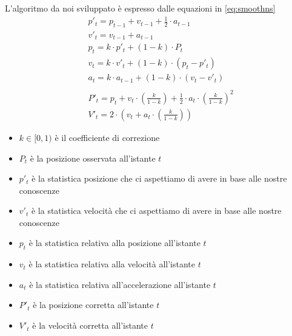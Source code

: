 L'algoritmo da noi sviluppato è espresso dalle equazioni in \ref{eq:smoothns}
\begin{equation}
    \label{eq:smoothns}
    \begin{split}
        & p'_t = p_{t-1} + v_{t-1} + \frac{1}{2} \cdot a_{t-1} \\
        & v'_t = v_{t-1} + a_{t-1} \\
        & p_t = k \cdot p'_t + (1-k) \cdot P_t \\
        & v_t = k \cdot v'_t + (1-k) \cdot (p_t - p'_t) \\
        & a_t = k \cdot a_{t-1} + (1-k) \cdot (v_t - v'_t) \\
        & \\
        & P'_t = p_t + v_t \cdot \left(\frac{k}{1-k}\right) + \frac{1}{2} \cdot a_t \cdot \left(\frac{k}{1-k}\right)^2 \\
        & V'_t = 2 \cdot \left(v_t + a_t \cdot \left(\frac{k}{1-k}\right)\right)
    \end{split}
\end{equation}
\begin{itemize}
    \item $k \in [0, 1)$ è il coefficiente di correzione
    \item $P_t$ è la posizione osservata all'istante $t$
    \item $p'_t$ è la statistica posizione che ci aspettiamo di avere in base alle nostre conoscenze
    \item $v'_t$ è la statistica velocità che ci aspettiamo di avere in base alle nostre conoscenze
    \item $p_t$ è la statistica relativa alla posizione all'istante $t$
    \item $v_t$ è la statistica relativa alla velocità all'istante $t$
    \item $a_t$ è la statistica relativa all'accelerazione all'istante $t$
    \item $P'_t$ è la posizione corretta all'istante $t$
    \item $V'_t$ è la velocità corretta all'istante $t$
\end{itemize}

